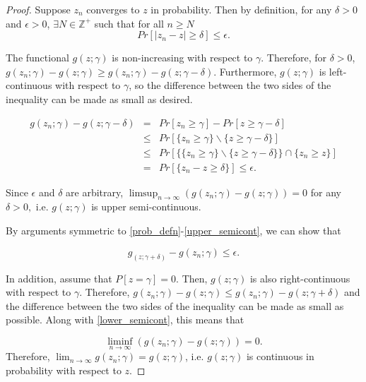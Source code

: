 \documentclass[12pt,oneside,final]{thesis}\usepackage[]{graphicx}\usepackage[]{color}
\begin{document}
\begin{proof}
Suppose $z_n$ converges to $z$ in probability. Then by definition, for any  $\delta>0$ and  $\epsilon>0$, $\exists	N\in\mathbb{Z^+}$ such that for all   $n \geq N$ 
$$ Pr\left[\left|z_n-z\right| \geq \delta \right] \leq \epsilon.$$

 The functional  $g(z;\gamma)$ is  non-increasing with respect to $\gamma$. Therefore, for $\delta>0$, 
$g(z_n;\gamma) -g(z;\gamma) \geq g(z_n;\gamma) -g(z;\gamma-\delta) $. Furthermore, $g(z;\gamma)$ is left-continuous with respect to $\gamma$, so the difference between the two sides of the inequality can be made as small as desired.

\begin{eqnarray}
g(z_n;\gamma) - g(z;\gamma-\delta) & = &Pr\left[z_n\geq \gamma \right] -Pr\left[z \geq  \gamma - \delta \right] \label{prob_defn}\\
& \leq &  Pr\left[\{z_n \geq \gamma \} \backslash \{z \geq \gamma - \delta \} \right] \label{set_diff}\\
& \leq & Pr\left[\{\{z_n \geq \gamma \} \backslash \{z \geq \gamma - \delta \} \} \cap \{z_n \geq  z\} \right] \label{conjunct_with_set} \\
& =  & Pr\left[\{z_n - z \geq \delta \} \right] \leq \epsilon. \label{upper_semicont}
\end{eqnarray}
 
Since $\epsilon$ and $\delta$ are arbitrary,
 $ \limsup_{n \rightarrow \infty} ( {g(z_n;\gamma)}- g(z;\gamma) ) =  0$ for any $\delta>0, $ i.e. $g(z;\gamma)$ is upper semi-continuous.

By arguments  symmetric to  \eqref{prob_defn}-\eqref{upper_semicont}, we can show that

\begin{equation}
g_(z;\gamma+\delta) - g(z_n;\gamma) \leq \epsilon. \label{lower_semicont}
\end{equation}


In addition, assume that  $P\left[z = \gamma \right]=0$. Then, $g(z;\gamma)$ is also right-continuous with respect to $\gamma$. Therefore, 
$g(z_n;\gamma) -g(z;\gamma) \leq g(z_n;\gamma) -g(z;\gamma+\delta)$ and the difference between the two sides of the inequality can be made as small as possible. 
Along with \eqref{lower_semicont}, this means that

 \[ 
\liminf_{n \rightarrow \infty} ( {g(z_n;\gamma)}- g(z;\gamma) ) = 0. 
\] Therefore, $\lim_{n\rightarrow \infty}g(z_n;\gamma) = g(z;\gamma)$, i.e. $g(z;\gamma)$ is continuous in probability with respect to $z$.
\end{proof}
\end{document}
